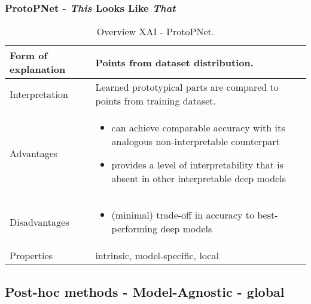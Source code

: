 \subsubsection{ProtoPNet - \textit{This} Looks Like \textit{That}}
\begin{table}[H]
  \centering
  \begin{tabular}{|p{}|p{}|}
    \hline
    Form of \newline explanation & Points from dataset distribution.
    \\
    
    \hline
    Interpretation & Learned prototypical parts are compared to points from training dataset.
     \\
 
    \hline
    Advantages &
    \begin{itemize}[nosep, left=0em]
        \item can achieve comparable accuracy with its analogous non-interpretable counterpart
        \item provides a level of interpretability that is absent in other interpretable deep models    
    \end{itemize} \\
    
    \hline
    Disadvantages &
    \begin{itemize}[nosep, left=0em]
        \item (minimal) trade-off in accuracy to best-performing deep models
    \end{itemize} \\
    
    \hline
    Properties & intrinsic, model-specific, local
      \\
    
    \hline
  \end{tabular}
  \caption[Overview XAI - ProtoPNet]{Overview XAI - ProtoPNet.\cite{NEURIPS2019_adf7ee2d}}
\end{table}

\subsection{Post-hoc methods - Model-Agnostic - global}

